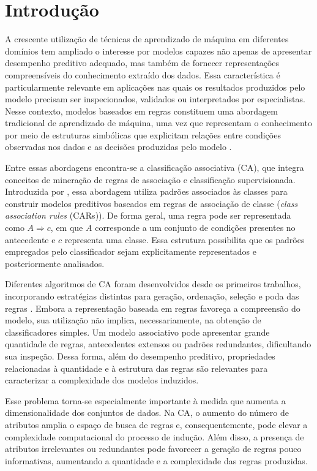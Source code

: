 \chapter{Introdução}\label{intro}

A crescente utilização de técnicas de aprendizado de máquina em diferentes domínios tem ampliado o interesse por modelos capazes não apenas de apresentar desempenho preditivo adequado, mas também de fornecer representações compreensíveis do conhecimento extraído dos dados. Essa característica é particularmente relevante em aplicações nas quais os resultados produzidos pelo modelo precisam ser inspecionados, validados ou interpretados por especialistas. Nesse contexto, modelos baseados em regras constituem uma abordagem tradicional de aprendizado de máquina, uma vez que representam o conhecimento por meio de estruturas simbólicas que explicitam relações entre condições observadas nos dados e as decisões produzidas pelo modelo \cite{Rudin2019,margot2021interpretability,molnar2022}.

Entre essas abordagens encontra-se a classificação associativa (CA), que integra conceitos de mineração de regras de associação e classificação supervisionada. Introduzida por , essa abordagem utiliza padrões associados às classes para construir modelos preditivos baseados em regras de associação de classe (\textit{class association rules} (CARs)). De forma geral, uma regra pode ser representada como $A \Rightarrow c$, em que $A$ corresponde a um conjunto de condições presentes no antecedente e $c$ representa uma classe. Essa estrutura possibilita que os padrões empregados pelo classificador sejam explicitamente representados e posteriormente analisados.

Diferentes algoritmos de CA foram desenvolvidos desde os primeiros trabalhos, incorporando estratégias distintas para geração, ordenação, seleção e poda das regras \cite{10.1016/j.eswa.2025.127454}. Embora a representação baseada em regras favoreça a compreensão do modelo, sua utilização não implica, necessariamente, na obtenção de classificadores simples. Um modelo associativo pode apresentar grande quantidade de regras, antecedentes extensos ou padrões redundantes, dificultando sua inspeção. Dessa forma, além do desempenho preditivo, propriedades relacionadas à quantidade e à estrutura das regras são relevantes para caracterizar a complexidade dos modelos induzidos.

Esse problema torna-se especialmente importante à medida que aumenta a dimensionalidade dos conjuntos de dados. Na CA, o aumento do número de atributos amplia o espaço de busca de regras e, consequentemente, pode elevar a complexidade computacional do processo de indução. Além disso, a presença de atributos irrelevantes ou redundantes pode favorecer a geração de regras pouco informativas, aumentando a quantidade e a complexidade das regras produzidas.

